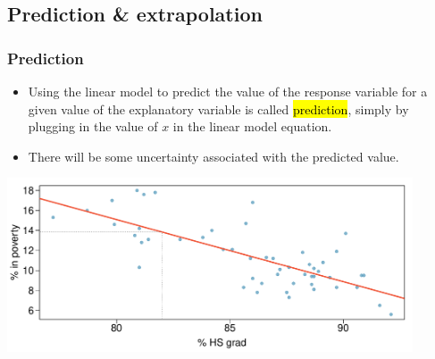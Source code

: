 
\subsection{Prediction \& extrapolation}



\begin{frame}
\frametitle{Prediction}

\begin{itemize}

\item Using the linear model to predict the value of the response variable for a given value of the explanatory variable is called \hl{prediction}, simply by plugging in the value of $x$ in the linear model equation.

\item There will be some uncertainty associated with the predicted value.

\end{itemize}

\begin{center}
\includegraphics[width=0.9\textwidth]{7-2_least_square_reg/figures/poverty/poverty_hsgrad_pred}
\end{center}

\end{frame}


